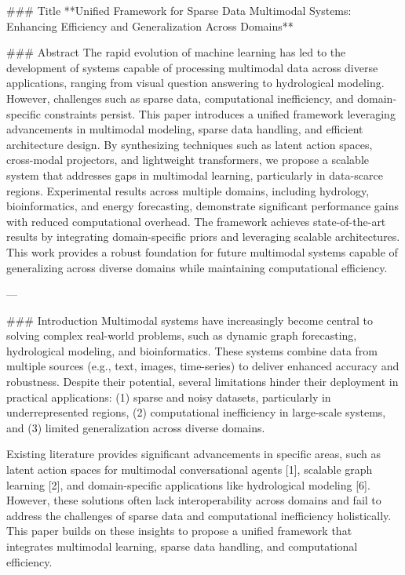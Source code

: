 ### Title
**Unified Framework for Sparse Data Multimodal Systems: Enhancing Efficiency and Generalization Across Domains**

### Abstract
The rapid evolution of machine learning has led to the development of systems capable of processing multimodal data across diverse applications, ranging from visual question answering to hydrological modeling. However, challenges such as sparse data, computational inefficiency, and domain-specific constraints persist. This paper introduces a unified framework leveraging advancements in multimodal modeling, sparse data handling, and efficient architecture design. By synthesizing techniques such as latent action spaces, cross-modal projectors, and lightweight transformers, we propose a scalable system that addresses gaps in multimodal learning, particularly in data-scarce regions. Experimental results across multiple domains, including hydrology, bioinformatics, and energy forecasting, demonstrate significant performance gains with reduced computational overhead. The framework achieves state-of-the-art results by integrating domain-specific priors and leveraging scalable architectures. This work provides a robust foundation for future multimodal systems capable of generalizing across diverse domains while maintaining computational efficiency.

---

### Introduction
Multimodal systems have increasingly become central to solving complex real-world problems, such as dynamic graph forecasting, hydrological modeling, and bioinformatics. These systems combine data from multiple sources (e.g., text, images, time-series) to deliver enhanced accuracy and robustness. Despite their potential, several limitations hinder their deployment in practical applications: (1) sparse and noisy datasets, particularly in underrepresented regions, (2) computational inefficiency in large-scale systems, and (3) limited generalization across diverse domains.

Existing literature provides significant advancements in specific areas, such as latent action spaces for multimodal conversational agents [1], scalable graph learning [2], and domain-specific applications like hydrological modeling [6]. However, these solutions often lack interoperability across domains and fail to address the challenges of sparse data and computational inefficiency holistically. This paper builds on these insights to propose a unified framework that integrates multimodal learning, sparse data handling, and computational efficiency.

